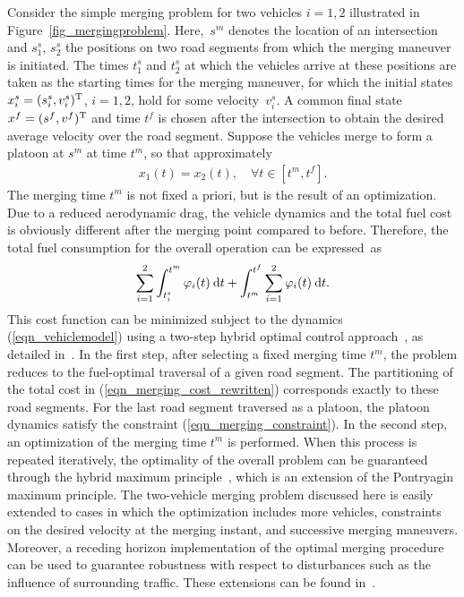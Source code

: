 \documentclass[journal]{IEEEtran}
\begin{document}
Consider the simple merging problem for two vehicles $i=1,2$ illustrated in Figure~\ref{fig_mergingproblem}. Here,~$s^m$ denotes the location of an intersection and $s_1^s$, $s_2^s$ the positions on two road segments from which the merging maneuver is initiated. The times $t_1^s$ and $t_2^s$  at which the vehicles arrive at these positions are taken as the starting times for the merging maneuver, for which the initial states $x_i^s =(s_i^s,v_i^s)^{\mathrm{T}}$, $i=1,2$, hold for some
velocity~$v_i^s$. A common final state $x^f = (s^f,v^f)^{\mathrm{T}}$ and time $t^f$ is chosen after the intersection to obtain the desired average velocity over the road segment. Suppose the vehicles merge to form a platoon at $s^m$ at time $t^m$, so that approximately
\begin{align}
x_1(t) = x_2(t), \quad \forall t\in[t^m,t^f].
\label{eqn_merging_constraint}
\end{align}
The merging time $t^m$ is not fixed a priori, but is the result of an optimization. Due to a reduced aerodynamic drag, the vehicle dynamics and the total fuel cost is obviously different after the merging point compared to before. Therefore, the total fuel consumption for the overall operation can be expressed~as
\begin{align}
\sum_{i=1}^2 \int_{t_i^s}^{t^m} \varphi_i(t) \:\mathrm{d} t + \int_{t^m}^{t^f} \sum_{i=1}^2 \varphi_i(t) \:\mathrm{d} t.
\label{eqn_merging_cost_rewritten}
\end{align}
This cost function can be minimized subject to the dynamics (\ref{eqn_vehiclemodel}) using a two-step hybrid optimal control approach~\cite{sussmann_1999,shaikh_2007}, as detailed in~\cite{koller_2015}. In the first step, after selecting a fixed merging time $t^m$, the problem reduces to the fuel-optimal traversal of a given road segment. The partitioning of the total cost in (\ref{eqn_merging_cost_rewritten}) corresponds exactly to these road segments. For the last road segment traversed as a platoon, the platoon dynamics satisfy the constraint (\ref{eqn_merging_constraint}). In the second step, an optimization of the merging time $t^m$ is performed. When this process is repeated iteratively, the optimality of the overall problem can be guaranteed through the hybrid maximum principle~\cite{sussmann_1999}, which is an extension of the Pontryagin maximum principle. The two-vehicle merging problem discussed here is easily extended to cases in which the optimization includes more vehicles, constraints on the desired velocity at the merging instant, and successive merging
maneuvers. Moreover, a receding horizon implementation of the optimal merging procedure can be used to guarantee robustness with respect to disturbances such as the influence of surrounding traffic. These extensions can be found in~\cite{koller_2015}.
\end{document}
